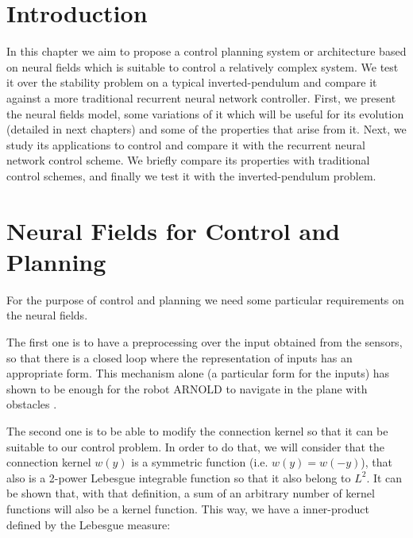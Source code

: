 \section{Introduction} 
In this chapter we aim to propose a control planning system or
architecture based on neural fields which is suitable to control a
relatively complex system. We test it over the stability problem on a
typical inverted-pendulum and compare it against a more traditional
recurrent neural network controller. First, we present the neural
fields model, some variations of it which will be useful for its
evolution (detailed in next chapters) and some of the properties that
arise from it. Next, we study its applications to control and compare
it with the recurrent neural network control scheme. We briefly
compare its properties with traditional control schemes, and finally
we test it with the inverted-pendulum problem.


\section{Neural Fields for Control and Planning}
For the purpose of control and planning we need some particular
requirements on the neural fields.

The first one is to have a preprocessing over the input
obtained from the sensors, so that there is a closed loop where the
representation of inputs has an appropriate form. This mechanism alone
(a particular form for the inputs) has shown to be enough for the robot
ARNOLD to navigate in the plane with obstacles
\cite{Bergener99Complex}.

The second one is to be able to modify the connection kernel so that
it can be suitable to our control problem. In order to do that, we
will consider that the connection kernel $w(y)$ is a symmetric
function (i.e. $w(y)=w(-y)$), that also is a 2-power Lebesgue
integrable function so that it also belong to $L^2$. It can be shown
that, with that definition, a sum of an arbitrary number of kernel
functions will also be a kernel function. This way, we have a
inner-product defined by the Lebesgue measure:

